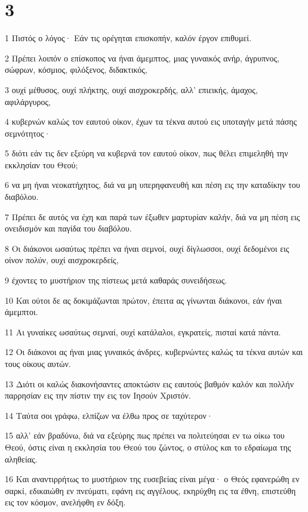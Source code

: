\chapter{3}

\par 1 Πιστός ο λόγος· Εάν τις ορέγηται επισκοπήν, καλόν έργον επιθυμεί.
\par 2 Πρέπει λοιπόν ο επίσκοπος να ήναι άμεμπτος, μιας γυναικός ανήρ, άγρυπνος, σώφρων, κόσμιος, φιλόξενος, διδακτικός,
\par 3 ουχί μέθυσος, ουχί πλήκτης, ουχί αισχροκερδής, αλλ' επιεικής, άμαχος, αφιλάργυρος,
\par 4 κυβερνών καλώς τον εαυτού οίκον, έχων τα τέκνα αυτού εις υποταγήν μετά πάσης σεμνότητος·
\par 5 διότι εάν τις δεν εξεύρη να κυβερνά τον εαυτού οίκον, πως θέλει επιμεληθή την εκκλησίαν του Θεού;
\par 6 να μη ήναι νεοκατήχητος, διά να μη υπερηφανευθή και πέση εις την καταδίκην του διαβόλου.
\par 7 Πρέπει δε αυτός να έχη και παρά των έξωθεν μαρτυρίαν καλήν, διά να μη πέση εις ονειδισμόν και παγίδα του διαβόλου.
\par 8 Οι διάκονοι ωσαύτως πρέπει να ήναι σεμνοί, ουχί δίγλωσσοι, ουχί δεδομένοι εις οίνον πολύν, ουχί αισχροκερδείς,
\par 9 έχοντες το μυστήριον της πίστεως μετά καθαράς συνειδήσεως.
\par 10 Και ούτοι δε ας δοκιμάζωνται πρώτον, έπειτα ας γίνωνται διάκονοι, εάν ήναι άμεμπτοι.
\par 11 Αι γυναίκες ωσαύτως σεμναί, ουχί κατάλαλοι, εγκρατείς, πισταί κατά πάντα.
\par 12 Οι διάκονοι ας ήναι μιας γυναικός άνδρες, κυβερνώντες καλώς τα τέκνα αυτών και τους οίκους αυτών.
\par 13 Διότι οι καλώς διακονήσαντες αποκτώσιν εις εαυτούς βαθμόν καλόν και πολλήν παρρησίαν εις την πίστιν την εις τον Ιησούν Χριστόν.
\par 14 Ταύτα σοι γράφω, ελπίζων να έλθω προς σε ταχύτερον·
\par 15 αλλ' εάν βραδύνω, διά να εξεύρης πως πρέπει να πολιτεύησαι εν τω οίκω του Θεού, όστις είναι η εκκλησία του Θεού του ζώντος, ο στύλος και το εδραίωμα της αληθείας.
\par 16 Και αναντιρρήτως το μυστήριον της ευσεβείας είναι μέγα· ο Θεός εφανερώθη εν σαρκί, εδικαιώθη εν πνεύματι, εφάνη εις αγγέλους, εκηρύχθη εις τα έθνη, επιστεύθη εις τον κόσμον, ανελήφθη εν δόξη.

